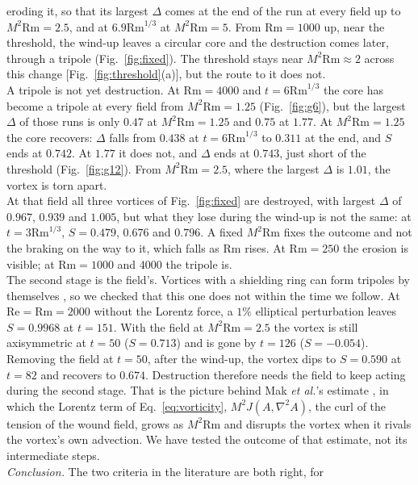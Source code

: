 \documentclass[aps,prl,twocolumn,reprint,amsmath,amssymb,superscriptaddress,floatfix]{revtex4-2}
\newcommand{\Rm}{\mathrm{Rm}}
\newcommand{\Rey}{\mathrm{Re}}
\begin{document}
eroding it, so that its largest $\Delta$ comes at the end of the run at every
field up to $M^2\Rm=2.5$, and at $6.9\Rm^{1/3}$ at $M^2\Rm=5$. From $\Rm=1000$ up,
near the threshold, the wind-up leaves a circular core and the destruction comes
later, through a tripole (Fig.~\ref{fig:fixed}). The threshold stays near
$M^2\Rm\approx2$ across this change [Fig.~\ref{fig:threshold}(a)], but the route
to it does not.\\
\indent A tripole is not yet destruction. At $\Rm=4000$ and $t=6\Rm^{1/3}$ the core has
become a tripole at every field from $M^2\Rm=1.25$ (Fig.~\ref{fig:g6}), but the
largest $\Delta$ of those runs is only $0.47$ at $M^2\Rm=1.25$ and $0.75$ at
$1.77$. At $M^2\Rm=1.25$ the core recovers: $\Delta$ falls from $0.438$ at
$t=6\Rm^{1/3}$ to $0.311$ at the end, and $S$ ends at $0.742$. At $1.77$ it does
not, and $\Delta$ ends at $0.743$, just short of the threshold
(Fig.~\ref{fig:g12}). From $M^2\Rm=2.5$, where the largest $\Delta$ is $1.01$, the
vortex is torn apart.\\
\indent At that field all three vortices of Fig.~\ref{fig:fixed} are destroyed, with
largest $\Delta$ of $0.967$, $0.939$ and $1.005$, but what they lose during the
wind-up is not the same: at $t=3\Rm^{1/3}$, $S=0.479$, $0.676$ and $0.796$. A
fixed $M^2\Rm$ fixes the outcome and not the braking on the way to it, which falls
as $\Rm$ rises. At $\Rm=250$ the erosion is visible; at $\Rm=1000$ and $4000$ the
tripole is.\\
\indent The second stage is the field's. Vortices with a shielding ring can
form tripoles by themselves \cite{carton1989}, so we checked that this one does not
within the time we follow. At $\Rey=\Rm=2000$ without the Lorentz force, a $1\%$
elliptical perturbation leaves $S=0.9968$ at $t=151$. With the field at
$M^2\Rm=2.5$ the vortex is still axisymmetric at $t=50$ ($S=0.713$) and is gone by
$t=126$ ($S=-0.054$). Removing the field at $t=50$, after the wind-up, the vortex
dips to $S=0.590$ at $t=82$ and recovers to $0.674$. Destruction therefore needs
the field to keep acting during the second stage. That is the picture behind Mak
\textit{et al.}'s estimate \cite{mak2017}, in which the Lorentz term of
Eq.~\eqref{eq:vorticity}, $M^2J(A,\nabla^2A)$, the curl of the tension of the
wound field, grows as $M^2\Rm$ and disrupts the vortex when it rivals the vortex's
own advection. We have tested the outcome of that estimate, not its intermediate
steps.\\
\indent \textit{Conclusion.} The two criteria in the literature are both right, for
\end{document}
